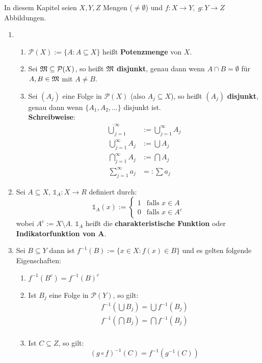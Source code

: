 In diesem Kapitel seien $X,Y,Z$ Mengen ($\ne\emptyset$) und
$f: X\to Y,\; g:Y\to Z$ Abbildungen.

\begin{enumerate}
    \item
    \begin{enumerate}
        \item $\mathcal{P}(X):=\{A:A\subseteq X\}$ heißt
              \textbf{Potenzmenge} von $X$.
        \item Sei $\mathfrak{M}\subseteq\mathcal{P}(X)$, so heißt $\mathfrak{M}$
              \textbf{disjunkt}, genau dann wenn $A\cap B=\emptyset$
              für $A,B\in\mathfrak{M}$ mit $A\ne B$.
        \item Sei $(A_j)$ eine Folge in $\mathcal{P}(X)$ (also
              $A_j\subseteq X$), so heißt $(A_j)$ \textbf{disjunkt},
              genau dann wenn $\{A_1,A_2,\dots\}$ disjunkt ist.\\
              \textbf{Schreibweise}:\\
              \begin{align*}
                \dot{\bigcup}_{j=1}^\infty &:=\bigcup_{j=1}^\infty A_j\\
                \bigcup_{j=1}^\infty A_j   &:=\bigcup A_j\\
                \bigcap_{j=1}^\infty A_j   &:=\bigcap A_j\\
                \sum_{j=1}^\infty a_j      &=: \sum a_j
              \end{align*}
    \end{enumerate}
    \item Sei $A\subseteq X$, $\mathds{1}_A : X \rightarrow R$
          definiert durch:
          \[\mathds{1}_A(x):= \begin{cases}
                1 &\text{falls } x\in A\\
                0 &\text{falls } x\in A^c
            \end{cases}\]
          wobei $A^c:=X\setminus A$. $\mathds{1}_A$ heißt die
          \textbf{charakteristische Funktion} oder
          \textbf{Indikatorfunktion von A}.
    \item Sei $B\subseteq Y$ dann ist $f^{-1}(B):=\{x\in X: f(x)\in B\}$
          und es gelten folgende Eigenschaften:
          \begin{enumerate}
            \item $f^{-1}(B^c)=f^{-1}(B)^c$
            \item Ist $B_j$ eine Folge in $\mathcal{P}(Y)$, so gilt:
                  \begin{align*}
                  f^{-1}(\bigcup B_j)=\bigcup f^{-1}(B_j)\\
                  f^{-1}(\bigcap B_j)=\bigcap f^{-1}(B_j)\\
                  \end{align*}
            \item Ist $C\subseteq Z$, so gilt:
                  \[(g\circ f)^{-1}(C)=f^{-1}(g^{-1}(C))\]
          \end{enumerate}
\end{enumerate}

